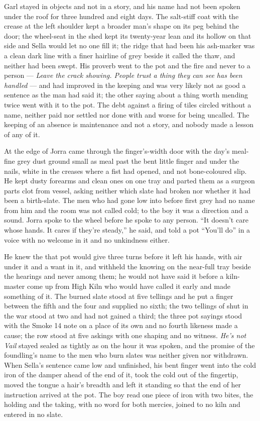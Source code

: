 Garl stayed in objects and not in a story, and his name had not been spoken under the roof for three hundred and eight days. The salt-stiff coat with the crease at the left shoulder kept a broader man's shape on its peg behind the door; the wheel-seat in the shed kept its twenty-year lean and its hollow on that side and Sella would let no one fill it; the ridge that had been his ash-marker was a clean dark line with a finer hairline of grey beside it called the thaw, and neither had been swept. His proverb went to the pot and the fire and never to a person --- \emph{Leave the crack showing. People trust a thing they can see has been handled} --- and had improved in the keeping and was very likely not as good a sentence as the man had said it; the other saying about a thing worth mending twice went with it to the pot. The debt against a firing of tiles circled without a name, neither paid nor settled nor done with and worse for being uncalled. The keeping of an absence is maintenance and not a story, and nobody made a lesson of any of it.

At the edge of  Jorra came through the finger's-width door with the day's meal-fine grey  dust ground small as meal past the bent little finger and under the nails, white in the creases where a fist had opened, and not bone-coloured slip. He kept dusty forearms and clean ones on one tray and parted them as a surgeon parts clot from vessel, asking neither which slate had broken nor whether it had been a birth-slate. The men who had gone low into  before first grey had no name from him and the room was not called cold; to the boy it was a direction and a sound. Jorra spoke to the wheel before he spoke to any person. “It doesn't care whose hands. It cares if they're steady,” he said, and told a pot “You'll do” in a voice with no welcome in it and no unkindness either.

He knew the  that pot would give three turns before it left his hands, with air under it and a want in it, and withheld the knowing on the near-full tray beside the hearings and never among them; he would not have said it before a kiln-master come up from High Kiln who would have called it early and made something of it. The burned slate stood at five tellings and he put a finger between the fifth and the four and supplied no sixth; the two tellings of  shut in the war stood at two and had not gained a third; the three pot sayings stood with the Smoke 14 note on a place of its own and no fourth likeness made a cause; the row stood at five askings with one shaping and no witness. \emph{He's not Vail} stayed sealed as tightly as on the hour it was spoken, and the promise of the foundling's name to the men who burn slates was neither given nor withdrawn. When Sella's sentence came low and unfinished, his bent finger went into the cold iron of the damper ahead of the end of it, took the cold out of the fingertip, moved the tongue a hair's breadth and left it standing so that the end of her instruction arrived at the pot. The boy read one piece of iron with two bites, the holding and the taking, with no  word for both mercies, joined to no kiln and entered in no slate.

